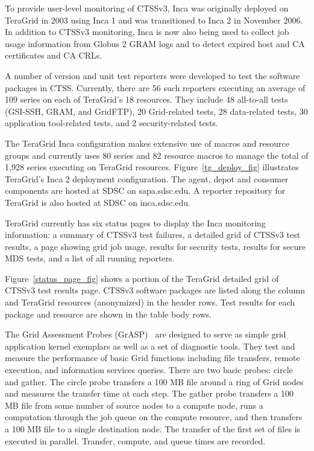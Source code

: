 \documentclass[times,10pt,twocolumn]{article}
\begin{document}
To provide user-level monitoring of CTSSv3, Inca was originally
deployed on TeraGrid in 2003 using Inca 1 and was transitioned to Inca 2 in
November 2006.  In addition to CTSSv3 monitoring, Inca is now also being used
to collect job usage information from Globus 2 GRAM logs and to detect expired
host and CA certificates and CA CRLs. 

A number of version and unit test reporters were developed to test the software packages in CTSS.
Currently, there are 56 such reporters executing an average of 109 series on
each of TeraGrid's 18 resources.  They include 48 all-to-all tests (GSI-SSH,
GRAM, and GridFTP), 20 Grid-related tests, 28 data-related tests, 30
application tool-related tests, and 2 security-related tests.  

The TeraGrid
Inca configuration makes extensive use of macros and resource groups and
currently uses 80 series and 82 resource macros to manage the total of 1,928
series executing on TeraGrid resources.
Figure~\ref{tg_deploy_fig} illustrates TeraGrid's Inca 2 deployment
configuration.  The
agent, depot and consumer components are hosted at SDSC on 
sapa.sdsc.edu.  A reporter repository for TeraGrid is also hosted
at SDSC on inca.sdsc.edu.  

TeraGrid currently has six status pages to display the Inca monitoring
information: a summary of CTSSv3 test failures, a detailed grid of CTSSv3 test
results, a page showing grid job
usage, results for security tests, results for secure MDS tests, and a list of
all running reporters.

Figure~\ref{status_page_fig} shows a portion of the TeraGrid detailed grid of
CTSSv3 test results
page.  CTSSv3 software packages are listed along the column and TeraGrid
resources (anonymized) in the header rows.  Test results for each package and
resource are shown in the table body rows.

\label{grasp}

The Grid Assessment Probes (GrASP)~\cite{grasp} are designed to 
serve as simple grid application kernel exemplars as well as a 
set of diagnostic tools. They test and measure the performance of 
basic Grid functions including file transfers, remote execution, 
and information services queries.  There are two basic probes: circle and 
gather.  The circle probe transfers a 100 MB file around a ring of
Grid nodes and measures the transfer time at each step.  The gather probe
transfers a 100 MB file from some number of source nodes to a compute node,
runs a computation through the job queue on the compute resource, and then
transfers a 100 MB file to a single destination node.  The transfer of the
first set of files is executed in parallel.  Transfer, compute, and queue times are recorded.
\end{document}
